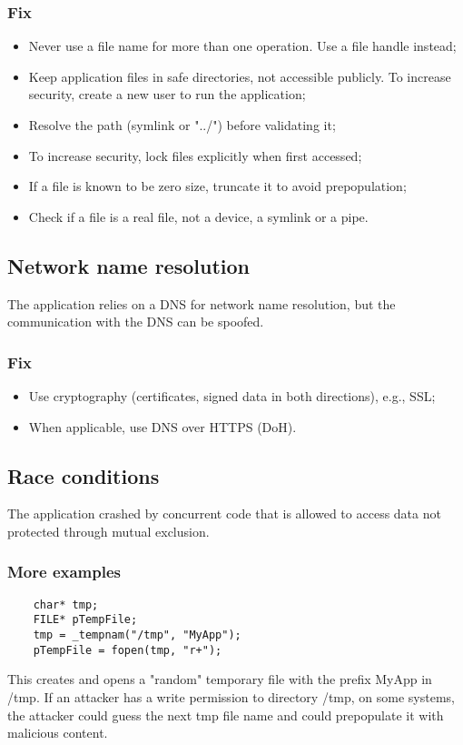 \documentclass[a4paper, 10pt, titlepage]{article}
\begin{document}
\subsubsection*{Fix}
\begin{itemize}
\item Never use a file name for more than one operation. Use a file handle instead;
\item Keep application files in safe directories, not accessible publicly. To increase security, create a new user to run the application;
\item Resolve the path (symlink or "../") before validating it;
\item To increase security, lock files explicitly when first accessed;
\item If a file is known to be zero size, truncate it to avoid prepopulation;
\item Check if a file is a real file, not a device, a symlink or a pipe.
\end{itemize}

\newpage
\subsection{Network name resolution}
The application relies on a DNS for network name resolution, but the communication with the DNS can be spoofed.
\subsubsection*{Fix}
\begin{itemize}
\item Use cryptography (certificates, signed data in both directions), e.g., SSL;
\item When applicable, use DNS over HTTPS (DoH).
\end{itemize}


\subsection{Race conditions}
The application crashed by concurrent code that is allowed to access data not protected through mutual exclusion.

\subsubsection*{More examples}
\begin{lstlisting}
	char* tmp;
	FILE* pTempFile;
	tmp = _tempnam("/tmp", "MyApp");
	pTempFile = fopen(tmp, "r+");
\end{lstlisting}
This creates and opens a "random" temporary file with the prefix MyApp in /tmp. If an attacker has a write permission to directory /tmp, on some systems, the attacker could guess the next tmp file name and could prepopulate it with malicious content. \medskip
\end{document}
